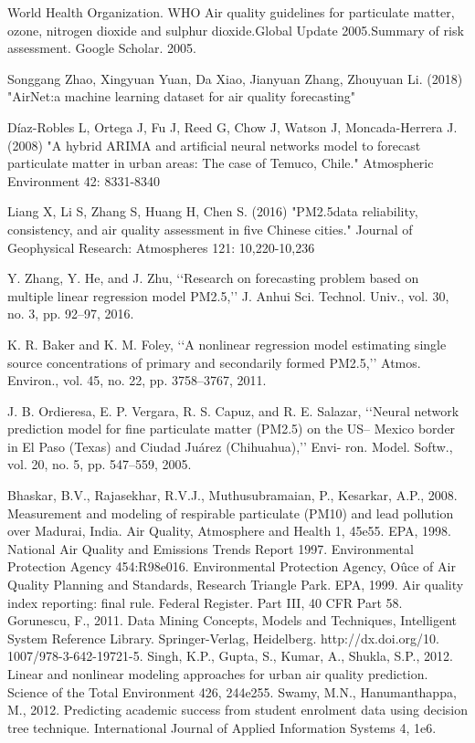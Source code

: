 \begin{thebibliography}{99}
World Health Organization. WHO Air quality guidelines for particulate matter, ozone, nitrogen dioxide and sulphur dioxide.Global Update
2005.Summary of risk assessment. Google Scholar. 2005.

Songgang Zhao, Xingyuan Yuan, Da Xiao, Jianyuan Zhang, Zhouyuan Li. (2018) "AirNet:a machine learning dataset for air quality
forecasting"

Díaz-Robles L, Ortega J, Fu J, Reed G, Chow J, Watson J, Moncada-Herrera J. (2008) "A hybrid ARIMA and artificial neural networks
model to forecast particulate matter in urban areas: The case of Temuco, Chile." Atmospheric Environment 42: 8331-8340

Liang X, Li S, Zhang S, Huang H, Chen S. (2016) "PM2.5data reliability, consistency, and air quality assessment in five Chinese cities."
Journal of Geophysical Research: Atmospheres 121: 10,220-10,236

Y. Zhang, Y. He, and J. Zhu, ‘‘Research on forecasting problem based
on multiple linear regression model PM2.5,’’ J. Anhui Sci. Technol. Univ.,
vol. 30, no. 3, pp. 92–97, 2016.

K. R. Baker and K. M. Foley, ‘‘A nonlinear regression model estimating
single source concentrations of primary and secondarily formed PM2.5,’’
Atmos. Environ., vol. 45, no. 22, pp. 3758–3767, 2011.

J. B. Ordieresa, E. P. Vergara, R. S. Capuz, and R. E. Salazar, ‘‘Neural
network prediction model for fine particulate matter (PM2.5) on the US–
Mexico border in El Paso (Texas) and Ciudad Juárez (Chihuahua),’’ Envi-
ron. Model. Softw., vol. 20, no. 5, pp. 547–559, 2005.

Bhaskar, B.V., Rajasekhar, R.V.J., Muthusubramaian, P., Kesarkar, A.P., 2008. Measurement and modeling of respirable particulate (PM10) and lead pollution over
Madurai, India. Air Quality, Atmosphere and Health 1, 45e55.
EPA, 1998. National Air Quality and Emissions Trends Report 1997. Environmental
Protection Agency 454:R98e016. Environmental Protection Agency, Oûce of Air
Quality Planning and Standards, Research Triangle Park.
EPA, 1999. Air quality index reporting: final rule. Federal Register. Part III, 40 CFR
Part 58.
Gorunescu, F., 2011. Data Mining Concepts, Models and Techniques, Intelligent
System Reference Library. Springer-Verlag, Heidelberg. http://dx.doi.org/10.
1007/978-3-642-19721-5.
Singh, K.P., Gupta, S., Kumar, A., Shukla, S.P., 2012. Linear and nonlinear modeling
approaches for urban air quality prediction. Science of the Total Environment
426, 244e255.
Swamy, M.N., Hanumanthappa, M., 2012. Predicting academic success from student
enrolment data using decision tree technique. International Journal of Applied
Information Systems 4, 1e6.

\end{thebibliography}



